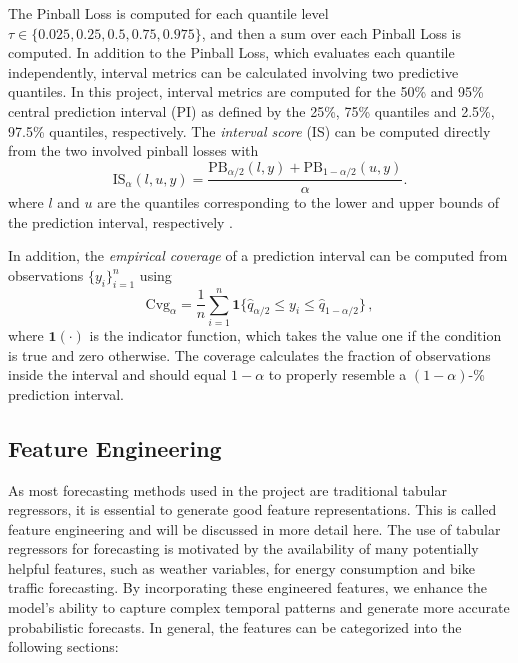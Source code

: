 The Pinball Loss is computed for each quantile level $\tau \in \{0.025, 0.25, 0.5, 0.75, 0.975\}$, and then a sum over each Pinball Loss is computed. In addition to the Pinball Loss, which evaluates each quantile independently, interval metrics can be calculated involving two predictive quantiles. In this project, interval metrics are computed for the 50\% and 95\% central prediction interval (PI) as defined by the 25\%, 75\% quantiles and 2.5\%, 97.5\% quantiles, respectively. The \textit{interval score} (IS) can be computed directly from the two involved pinball losses with
\begin{equation}
\label{eq:IntervalScore}
\text{IS}_{\alpha}(l, u, y) = \frac{\text{PB}_{\alpha/2}(l, y) + \text{PB}_{1-\alpha/2}(u, y)}{\alpha}.
\end{equation}
where $l$ and $u$ are the quantiles corresponding to the lower and upper bounds of the prediction interval, respectively \parencite[370]{gneiting_strictly_2007}. 

In addition, the \textit{empirical coverage} of a prediction interval can be computed from 
observations $\{y_i\}_{i=1}^{n}$ using
\begin{equation}
    \text{Cvg}_{\alpha} = \frac{1}{n} \sum_{i = 1}^{n} \mathbf{1}\{ \hat{q}_{\alpha/2} \leq y_i \leq \hat{q}_{1 - \alpha /2 } \} \,,
\end{equation}
where $\mathbf{1}(\cdot)$ is the indicator function, which takes the value one if the condition is true and zero otherwise.
The coverage calculates the fraction of observations inside the interval and should equal $1 - \alpha$ to properly resemble a $(1 - \alpha)$-\% prediction interval.


\subsection{Feature Engineering}
\label{sec:Methodology:FeatureEngineering}

As most forecasting methods used in the project are traditional tabular regressors, it is essential to generate good feature representations. 
This is called feature engineering and will be discussed in more detail here.
The use of tabular regressors for forecasting is motivated by the availability of many potentially helpful features, such as weather variables, for energy consumption and bike traffic forecasting.
By incorporating these engineered features, we enhance the model's ability to 
capture complex temporal patterns and generate more accurate probabilistic forecasts.
In general, the features can be categorized into the following sections:


